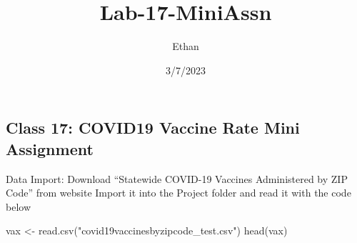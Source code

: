 \documentclass[
]{article}
\title{Lab-17-MiniAssn}
\author{Ethan}
\date{3/7/2023}
\newenvironment{Shaded}{\begin{snugshade}}{\end{snugshade}}
\newcommand{\FunctionTok}[1]{\textcolor[rgb]{0.00,0.00,0.00}{#1}}
\newcommand{\NormalTok}[1]{#1}
\newcommand{\OtherTok}[1]{\textcolor[rgb]{0.56,0.35,0.01}{#1}}
\newcommand{\StringTok}[1]{\textcolor[rgb]{0.31,0.60,0.02}{#1}}
\begin{document}
\maketitle

\hypertarget{class-17-covid19-vaccine-rate-mini-assignment}{%
\subsection{Class 17: COVID19 Vaccine Rate Mini
Assignment}\label{class-17-covid19-vaccine-rate-mini-assignment}}

Data Import: Download ``Statewide COVID-19 Vaccines Administered by ZIP
Code'' from website Import it into the Project folder and read it with
the code below

\begin{Shaded}
\begin{Highlighting}[]
\NormalTok{vax }\OtherTok{\textless{}{-}} \FunctionTok{read.csv}\NormalTok{(}\StringTok{"covid19vaccinesbyzipcode\_test.csv"}\NormalTok{)}
\FunctionTok{head}\NormalTok{(vax)}
\end{Highlighting}
\end{Shaded}
\end{document}
